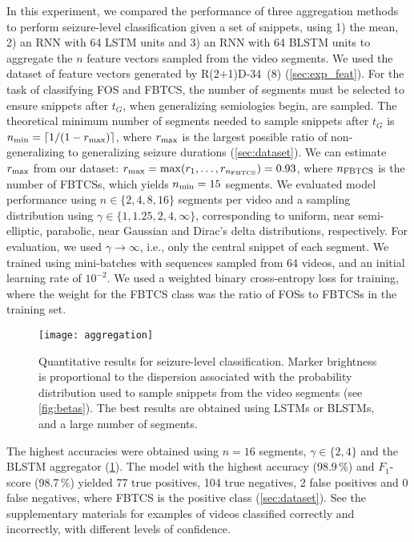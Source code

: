 In this experiment, we compared the performance of three aggregation methods to perform seizure-level classification given a set of snippets, using
1) the mean,
2) an \ac{RNN} with 64 \ac{LSTM} units and
3) an \ac{RNN} with 64 \ac{BLSTM} units
to aggregate the $n$ feature vectors sampled from the video segments.
We used the dataset of feature vectors generated by \mbox{R(2+1)D-34 (8)} (\cref{sec:exp_feat}).
For the task of classifying \ac{FOS} and \ac{FBTCS}, the number of segments must be selected to ensure snippets after $t_G$, when generalizing semiologies begin, are sampled.
The theoretical minimum number of segments needed to sample snippets after $t_G$ is $n_{\text{min}} = \lceil 1 / (1 - r_{\text{max}}) \rceil $, where $r_{\text{max}}$ is the largest possible ratio of non-generalizing to generalizing seizure durations (\cref{sec:dataset}).
We can estimate $r_{\text{max}}$ from our dataset: $r_{\text{max}} = \max ( r_1, \dots, r_{n_{\text{FBTCS}}} ) = 0.93$, where $n_{\text{FBTCS}}$ is the number of \acp{FBTCS}, which yields $n_{\text{min}} = 15$ segments.
We evaluated model performance using $n \in \{2, 4, 8, 16\}$ segments per video and a sampling distribution using $\gamma \in \{ 1, 1.25, 2, 4, \infty \}$, corresponding to uniform, near semi-elliptic, parabolic, near Gaussian and Dirac's delta distributions, respectively.
For evaluation, we used $\gamma \rightarrow \infty$, i.e., only the central snippet of each segment.
We trained using mini-batches with sequences sampled from 64 videos, and an initial learning rate of $10 ^ {-2}$.
We used a weighted binary cross-entropy loss for training, where the weight for the \ac{FBTCS} class was the ratio of \acp{FOS} to \acp{FBTCS} in the training set.


\begin{figure}
  \centering
  \texttt{[image: aggregation]}
  \caption[Quantitative results for seizure-level classification]{
    Quantitative results for seizure-level classification.
    Marker brightness is proportional to the dispersion associated with the probability distribution used to sample snippets from the video segments (see \cref{fig:betas}).
    The best results are obtained using \acp{LSTM} or \acp{BLSTM}, and a large number of segments.
  }
  \label{fig:aggregation}
\end{figure}

The highest accuracies were obtained using $n = 16$ segments, $\gamma \in \{ 2, 4 \}$ and the \ac{BLSTM} aggregator (\cref{fig:aggregation}).
The model with the highest accuracy (98.9\,\%) and $F_1$-score (98.7\,\%) yielded 77 true positives, 104 true negatives, 2 false positives and 0 false negatives, where \ac{FBTCS} is the positive class (\cref{sec:dataset}).
See the supplementary materials%
for examples of videos classified correctly and incorrectly, with different levels of confidence.
